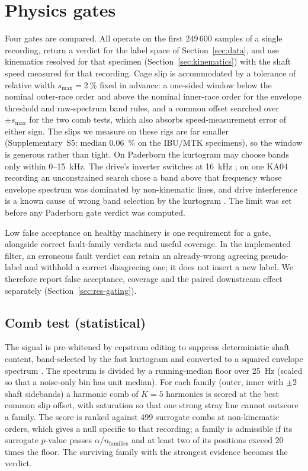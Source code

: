 \section{Physics gates}
\label{sec:gates}

Four gates are compared. All operate on the first 249\,600 samples of a single recording, return a verdict for the label
space of Section~\ref{sec:data}, and use kinematics resolved for that specimen (Section~\ref{sec:kinematics}) with the shaft
speed measured for that recording. Cage slip is accommodated by a tolerance of relative width $s_{\max} = \SI{2}{\percent}$
fixed in advance: a one-sided window below the nominal outer-race order and above the nominal inner-race order for the
envelope threshold and raw-spectrum band rules, and a common offset searched over $\pm s_{\max}$ for the two comb tests, which also absorbs
speed-measurement error of either sign. The slips we measure on
these rigs are far smaller (Supplementary~S5: median \SI{0.06}{\percent} on the IBU/MTK specimens), so the window is
generous rather than tight. On Paderborn the kurtogram may choose bands only within 0--15~kHz. The drive's inverter switches
at 16~kHz \cite{lessmeier2016}; on one KA04 recording an unconstrained search chose a band above that frequency whose
envelope spectrum was dominated by non-kinematic lines, and drive interference is a known cause of wrong band selection by
the kurtogram \cite{smith2016emi,mauricio2020emi}. The limit was set before any Paderborn gate verdict was computed.

Low false acceptance on healthy machinery is one requirement for a gate, alongside correct fault-family verdicts and useful coverage. In the implemented filter, an erroneous fault verdict can retain an already-wrong agreeing pseudo-label and withhold a correct disagreeing one; it does not insert a new label. We therefore report false acceptance, coverage and the paired downstream effect separately (Section~\ref{sec:res-gating}).

\subsection{Comb test (statistical)}
\label{sec:gate-comb}

The signal is pre-whitened by cepstrum editing to suppress deterministic shaft
content, band-selected by the fast kurtogram \cite{antoni2007kurtogram} and converted to a squared envelope spectrum
\cite{randall2011}. The spectrum is divided by a running-median floor over \SI{25}{Hz} (scaled so that a noise-only bin has
unit median). For each family (outer, inner with $\pm2$ shaft sidebands) a harmonic comb of $K=5$ harmonics is scored at the
best common slip offset, with saturation so that one strong stray line cannot outscore a family. The score is ranked against
499 surrogate combs at non-kinematic orders, which gives a null specific to that recording; a family is admissible if its
surrogate $p$-value passes $\alpha/n_{\mathrm{families}}$ and at least two of its positions exceed 20 times the floor. The
surviving family with the strongest evidence becomes the verdict.

